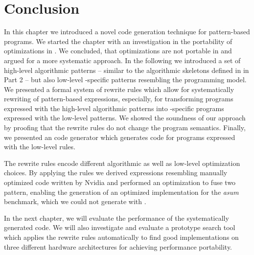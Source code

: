 \newpage











\section{Conclusion}
In this chapter we introduced a novel code generation technique for pattern-based programs.
We started the chapter with an investigation in the portability of optimizations in \OpenCL.
We concluded, that optimizations are not portable in \OpenCL and argued for a more systematic approach.
In the following we introduced a set of high-level algorithmic patterns -- similar to the algorithmic skeletons defined in \SkelCL in Part 2 -- but also low-level \OpenCL-specific patterns resembling the \OpenCL programming model.
We presented a formal system of rewrite rules which allow for systematically rewriting of pattern-based expressions, especially, for transforming programs expressed with the high-level algorithmic patterns into \OpenCL-specific programs expressed with the low-level patterns.
We showed the soundness of our approach by proofing that the rewrite rules do not change the program semantics.
Finally, we presented an \OpenCL code generator which generates \OpenCL code for programs expressed with the low-level rules.

The rewrite rules encode different algorithmic as well as low-level optimization choices.
By applying the rules we derived expressions resembling manually optimized \OpenCL code written by Nvidia and performed an optimization to fuse two pattern, enabling the generation of an optimized implementation for the \emph{asum} benchmark, which we could not generate with \SkelCL.

In the next chapter, we will evaluate the performance of the systematically generated \OpenCL code.
We will also investigate and evaluate a prototype search tool which applies the rewrite rules automatically to find good implementations on three different hardware architectures for achieving performance portability.

